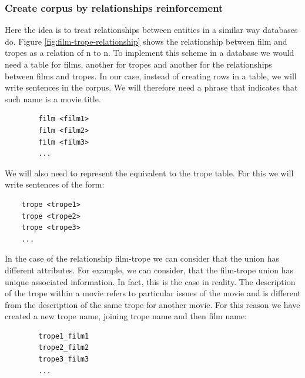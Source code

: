 \documentclass[letterpaper]{article}
\begin{document}
	
	
	\subsubsection{Create corpus by relationships reinforcement}
	
	Here the idea is to treat relationships between entities in a similar way databases do. Figure \ref{fig:film-trope-relationship} shows the relationship between
	 film and tropes as a relation of n to n. To implement this scheme in a database we would need a table for films, another for tropes and another for the relationships 
	 between films and tropes. In our case, instead of creating rows in a table, we will write sentences in the corpus. We will therefore need a phrase that indicates that such
	 name is a movie title.
	 
	 	\begin{verbatim}
	 	film <film1>
	 	film <film2>
	 	film <film3>
	 	...
	 	\end{verbatim}
	 	
	 We will also need to represent the equivalent to the trope table. For this we will write sentences of the form:
		\begin{verbatim}
	trope <trope1>
	trope <trope2>
	trope <trope3>
	...
	\end{verbatim}

	In the case of the relationship film-trope we can consider that the union has different attributes. For example, we can consider, that the film-trope union has unique associated information.  In fact, this is the case in reality. The description of the trope within a movie refers to particular issues of the movie and is different from the description of the same trope for another movie. For this reason we have created a new trope name, joining trope name and then film name:
		\begin{verbatim}
		trope1_film1
		trope2_film2
		trope3_film3
		...		
	    \end{verbatim}
	    
\end{document}
